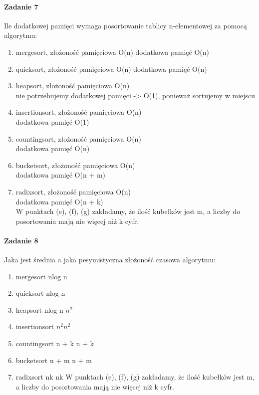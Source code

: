\documentclass[18pt]{extarticle}
\begin{document}
\paragraph{Zadanie 7} Ile dodatkowej pamięci wymaga posortowanie tablicy n-elementowej za pomocą algorytmu:
\begin{enumerate}[label=\alph*.]
    \item mergesort, złożoność pamięciowa O(n)
            dodatkowa pamięć O(n)
    \item quicksort, złożoność pamięciowa O(n)
            dodatkowa pamięć O(n)
    \item heapsort, złożoność pamięciowa O(n)\\
            nie potrzebujemy dodatkowej pamięci -> O(1), ponieważ sortujemy w miejscu
    \item insertionsort, złożoność pamięciowa O(n)\\
            dodatkowa pamięć O(1)
    \item countingsort, złożoność pamięciowa O(n)\\
            dodatkowa pamięć O(n)
    \item bucketsort, złożoność pamięciowa O(n)\\
            dodatkowa pamięć O(n + m)
    \item radixsort, złożoność pamięciowa O(n)\\
            dodatkowa pamięć O(n + k)\\

    W punktach (e), (f), (g) zakładamy, że ilość kubełków jest m, a liczby do posortowania mają nie więcej niż k cyfr.
\end{enumerate}

\paragraph{Zadanie 8} Jaka jest średnia a jaka pesymistyczna złożoność czasowa algorytmu:
\begin{enumerate}[label=\alph*]
    \item mergesort nlog n
    \item quicksort nlog n
    \item heapsort nlog n  $n^2$
    \item insertionsort $n^2 n^2$
    \item countingsort n + k n + k
    \item bucketsort n + m n + m
    \item radixsort nk nk
    W punktach (e), (f), (g) zakładamy, że ilość kubełków jest m, a liczby do posortowania mają nie więcej niż k cyfr.
\end{enumerate}
\end{document}
